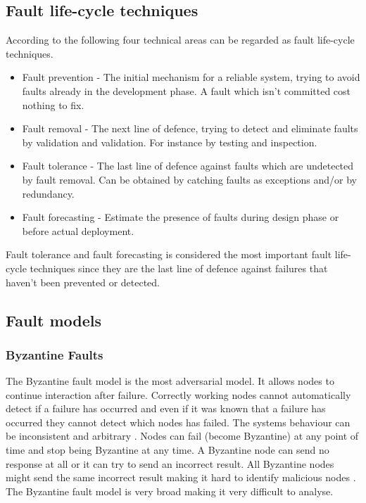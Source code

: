\documentclass{cslthse-msc}
\begin{document}
\subsection{Fault life-cycle techniques}
According to \cite{softRelRoadmap} the following four technical areas can be regarded as fault life-cycle techniques.
\begin{itemize}
\item Fault prevention - The initial mechanism for a reliable system, trying to avoid faults already in the development phase. A fault which isn't committed cost nothing to fix. 
\item Fault removal - The next line of defence, trying to detect and eliminate faults by validation and validation. For instance by testing and inspection. 
\item Fault tolerance - The last line of defence against faults which are undetected by fault removal. Can be obtained by catching faults as exceptions and/or by redundancy.
\item Fault forecasting - Estimate the presence of faults during design phase or before actual deployment. 
\end{itemize}

Fault tolerance and fault forecasting is considered the most important fault life-cycle techniques since they are the last line of defence against failures that haven't been prevented or detected.

\subsection{Fault models}
\subsubsection*{Byzantine Faults}
The Byzantine fault model is the most adversarial model. It allows nodes to continue interaction after failure. Correctly working nodes cannot automatically detect if a failure has occurred and even if it was known that a failure has occurred they cannot detect which nodes has failed. The systems behaviour can be inconsistent and arbitrary \cite{surveyFaultParallel}. Nodes can fail (become Byzantine) at any point of time and stop being Byzantine at any time. A Byzantine node can send no response at all or it can try to send an incorrect result. All Byzantine nodes might send the same incorrect result making it hard to identify malicious nodes \cite{selfAdaptRel}. %
The Byzantine fault model is very broad making it very difficult to analyse.
\end{document}
